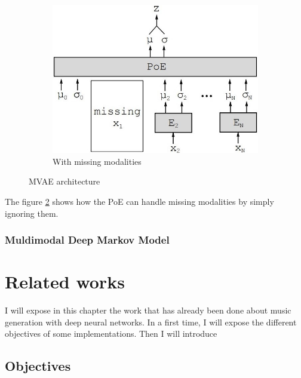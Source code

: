 \documentclass[12pt]{report}
\begin{document}
\begin{figure}[h]
\begin{subfigure}[t]{0.49\textwidth}
        \includegraphics[width=.9 \textwidth]{images/nn/architectures/mvae_missing.jpg}
        \caption{With missing modalities}
        \label{fig:mvae_architecture_missing}
    \end{subfigure}
    \caption{MVAE architecture}
    \label{fig:mvae_architecture}
\end{figure}

The figure \ref{fig:mvae_architecture} shows how the PoE can handle missing modalities by simply ignoring them.

\subsection{Muldimodal Deep Markov Model}



\chapter{Related works}

I will expose in this chapter the work that has already been done about music generation with deep neural networks.
In a first time, I will expose the different objectives of some implementations.
Then I will introduce 


\section{Objectives}        %
\end{document}
